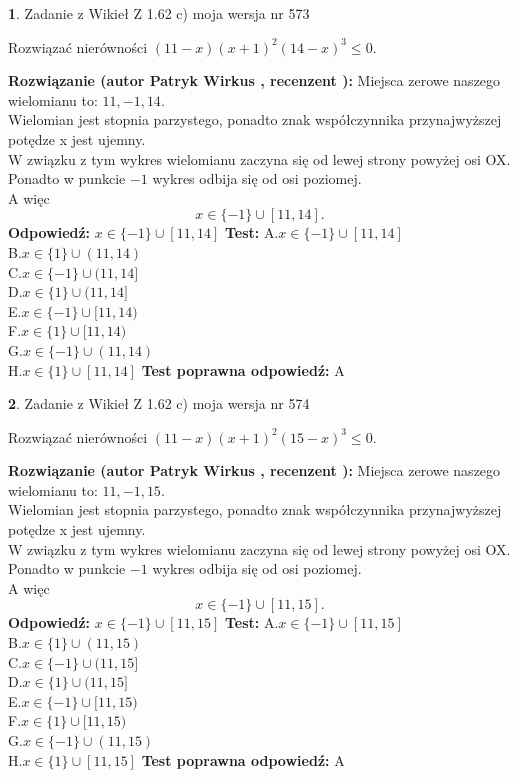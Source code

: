 \documentclass[12pt, a4paper]{article}
\theoremstyle{definition} %
\newtheorem{zad}{}
\newcommand{\zadStart}[1]{\begin{zad}#1\newline}
\newcommand{\zadStop}{\end{zad}}
\newcommand{\rozwStart}[2]{\noindent \textbf{Rozwiązanie (autor #1 , recenzent #2): }\newline}
\newcommand{\rozwStop}{\newline}
\newcommand{\odpStart}{\noindent \textbf{Odpowiedź:}\newline}
\newcommand{\odpStop}{\newline}
\newcommand{\testStart}{\noindent \textbf{Test:}\newline}
\newcommand{\testStop}{\newline}
\newcommand{\kluczStart}{\noindent \textbf{Test poprawna odpowiedź:}\newline}
\newcommand{\kluczStop}{\newline}
\begin{document}
\zadStart{Zadanie z Wikieł Z 1.62 c) moja wersja nr 573}

Rozwiązać nierówności $(11-x)(x+1)^{2}(14-x)^{3}\le0$.
\zadStop
\rozwStart{Patryk Wirkus}{}
Miejsca zerowe naszego wielomianu to: $11, -1, 14$.\\
Wielomian jest stopnia parzystego, ponadto znak współczynnika przy\linebreak najwyższej potędze x jest ujemny.\\ W związku z tym wykres wielomianu zaczyna się od lewej strony powyżej osi OX.\\
Ponadto w punkcie $-1$ wykres odbija się od osi poziomej.\\
A więc $$x \in \{-1\} \cup [11,14].$$
\rozwStop
\odpStart
$x \in \{-1\} \cup [11,14]$
\odpStop
\testStart
A.$x \in \{-1\} \cup [11,14]$\\
B.$x \in \{1\} \cup (11,14)$\\
C.$x \in \{-1\} \cup (11,14]$\\
D.$x \in \{1\} \cup (11,14]$\\
E.$x \in \{-1\} \cup [11,14)$\\
F.$x \in \{1\} \cup [11,14)$\\
G.$x \in \{-1\} \cup (11,14)$\\
H.$x \in \{1\} \cup [11,14]$
\testStop
\kluczStart
A
\kluczStop



\zadStart{Zadanie z Wikieł Z 1.62 c) moja wersja nr 574}

Rozwiązać nierówności $(11-x)(x+1)^{2}(15-x)^{3}\le0$.
\zadStop
\rozwStart{Patryk Wirkus}{}
Miejsca zerowe naszego wielomianu to: $11, -1, 15$.\\
Wielomian jest stopnia parzystego, ponadto znak współczynnika przy\linebreak najwyższej potędze x jest ujemny.\\ W związku z tym wykres wielomianu zaczyna się od lewej strony powyżej osi OX.\\
Ponadto w punkcie $-1$ wykres odbija się od osi poziomej.\\
A więc $$x \in \{-1\} \cup [11,15].$$
\rozwStop
\odpStart
$x \in \{-1\} \cup [11,15]$
\odpStop
\testStart
A.$x \in \{-1\} \cup [11,15]$\\
B.$x \in \{1\} \cup (11,15)$\\
C.$x \in \{-1\} \cup (11,15]$\\
D.$x \in \{1\} \cup (11,15]$\\
E.$x \in \{-1\} \cup [11,15)$\\
F.$x \in \{1\} \cup [11,15)$\\
G.$x \in \{-1\} \cup (11,15)$\\
H.$x \in \{1\} \cup [11,15]$
\testStop
\kluczStart
A
\kluczStop
\end{document}

